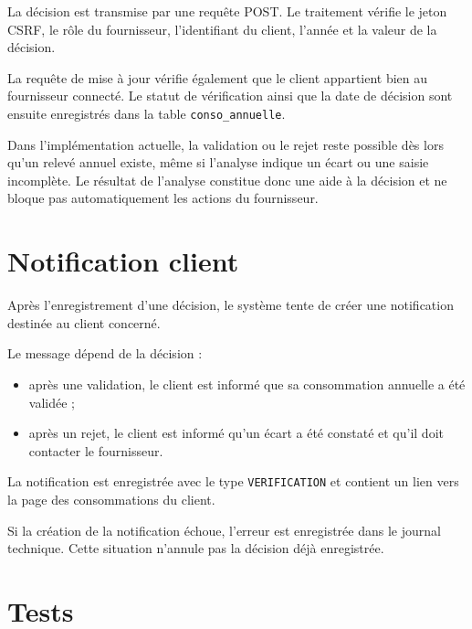 La décision est transmise par une requête POST. Le traitement vérifie le jeton CSRF, le rôle du fournisseur, l'identifiant du client, l'année et la valeur de la décision.

La requête de mise à jour vérifie également que le client appartient bien au fournisseur connecté. Le statut de vérification ainsi que la date de décision sont ensuite enregistrés dans la table \texttt{conso\_annuelle}.

Dans l'implémentation actuelle, la validation ou le rejet reste possible dès lors qu'un relevé annuel existe, même si l'analyse indique un écart ou une saisie incomplète. Le résultat de l'analyse constitue donc une aide à la décision et ne bloque pas automatiquement les actions du fournisseur.

\section{Notification client}

Après l'enregistrement d'une décision, le système tente de créer une notification destinée au client concerné.

Le message dépend de la décision :
\begin{itemize}
    \item après une validation, le client est informé que sa consommation annuelle a été validée ;
    \item après un rejet, le client est informé qu'un écart a été constaté et qu'il doit contacter le fournisseur.
\end{itemize}

La notification est enregistrée avec le type \texttt{VERIFICATION} et contient un lien vers la page des consommations du client.

Si la création de la notification échoue, l'erreur est enregistrée dans le journal technique. Cette situation n'annule pas la décision déjà enregistrée.

\section{Tests}

